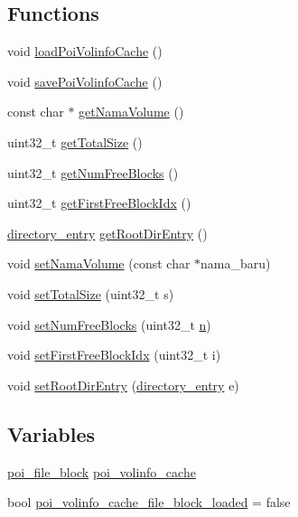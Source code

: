 \subsection*{Functions}
\begin{DoxyCompactItemize}
\item 
void \hyperlink{volume-information_8c_af6d08c2f02ba561e21c8aeef199e20f2}{load\-Poi\-Volinfo\-Cache} ()
\item 
void \hyperlink{volume-information_8c_a1411a8d39fd2b72db7e153f715662214}{save\-Poi\-Volinfo\-Cache} ()
\item 
const char $\ast$ \hyperlink{volume-information_8c_aedec943e322464900a140b69fa2e284b}{get\-Nama\-Volume} ()
\item 
uint32\-\_\-t \hyperlink{volume-information_8c_abd30ee89eb14436746e6a963c90cd1a4}{get\-Total\-Size} ()
\item 
uint32\-\_\-t \hyperlink{volume-information_8c_ae397a4a9fdd9cc21529262cfe1597e50}{get\-Num\-Free\-Blocks} ()
\item 
uint32\-\_\-t \hyperlink{volume-information_8c_aff9dadb573d07c60c0281c3441ba3881}{get\-First\-Free\-Block\-Idx} ()
\item 
\hyperlink{structdirectory__entry}{directory\-\_\-entry} \hyperlink{volume-information_8c_a32c12de0ce0f231386676aca679e459e}{get\-Root\-Dir\-Entry} ()
\item 
void \hyperlink{volume-information_8c_afb97ee78665af0ad59773de9169b8d0a}{set\-Nama\-Volume} (const char $\ast$nama\-\_\-baru)
\item 
void \hyperlink{volume-information_8c_a5a38fa39d4774e25a470604479149f66}{set\-Total\-Size} (uint32\-\_\-t s)
\item 
void \hyperlink{volume-information_8c_a449879e861486007ba0d9b0881b804b1}{set\-Num\-Free\-Blocks} (uint32\-\_\-t \hyperlink{allocation-table-test_8c_a24010dade8ebab3f87a48022772cd975}{n})
\item 
void \hyperlink{volume-information_8c_a0fb677f67435306a93428db283b03f94}{set\-First\-Free\-Block\-Idx} (uint32\-\_\-t i)
\item 
void \hyperlink{volume-information_8c_a234d0a3df8f5d12d3d0ca9282bb143a8}{set\-Root\-Dir\-Entry} (\hyperlink{structdirectory__entry}{directory\-\_\-entry} e)
\end{DoxyCompactItemize}
\subsection*{Variables}
\begin{DoxyCompactItemize}
\item 
\hyperlink{structpoi__file__block}{poi\-\_\-file\-\_\-block} \hyperlink{volume-information_8c_a9ad527e49b8634c19d5ec939f5204d78}{poi\-\_\-volinfo\-\_\-cache}
\item 
bool \hyperlink{volume-information_8c_a3884cefaefb7b0de464dde64e1a9226d}{poi\-\_\-volinfo\-\_\-cache\-\_\-file\-\_\-block\-\_\-loaded} = false
\end{DoxyCompactItemize}


